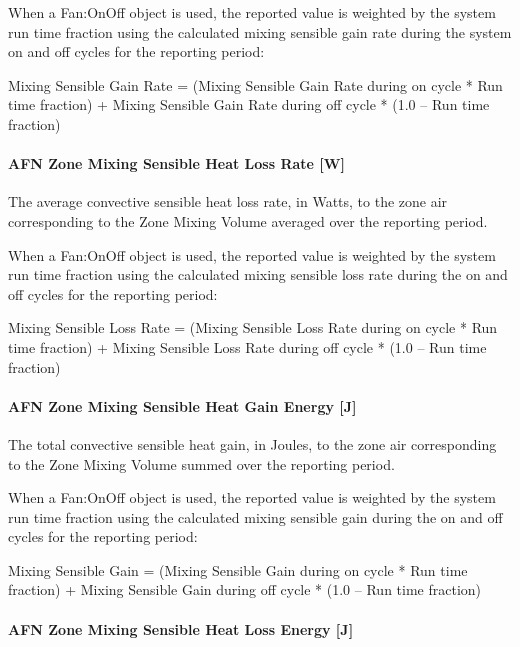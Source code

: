 When a Fan:OnOff object is used, the reported value is weighted by the system run time fraction using the calculated mixing sensible gain rate during the system on and off cycles for the reporting period:

Mixing Sensible Gain Rate = (Mixing Sensible Gain Rate during on cycle * Run time fraction) + Mixing Sensible Gain Rate during off cycle * (1.0 -- Run time fraction)

\paragraph{AFN Zone Mixing Sensible Heat Loss Rate {[}W{]}}\label{afn-zone-mixing-sensible-heat-loss-rate-w}

The average convective sensible heat loss rate, in Watts, to the zone air corresponding to the Zone Mixing Volume averaged over the reporting period.

When a Fan:OnOff object is used, the reported value is weighted by the system run time fraction using the calculated mixing sensible loss rate during the on and off cycles for the reporting period:

Mixing Sensible Loss Rate = (Mixing Sensible Loss Rate during on cycle * Run time fraction) + Mixing Sensible Loss Rate during off cycle * (1.0 -- Run time fraction)

\paragraph{AFN Zone Mixing Sensible Heat Gain Energy {[}J{]}}\label{afn-zone-mixing-sensible-heat-gain-energy-j}

The total convective sensible heat gain, in Joules, to the zone air corresponding to the Zone Mixing Volume summed over the reporting period.

When a Fan:OnOff object is used, the reported value is weighted by the system run time fraction using the calculated mixing sensible gain during the on and off cycles for the reporting period:

Mixing Sensible Gain = (Mixing Sensible Gain during on cycle * Run time fraction) + Mixing Sensible Gain during off cycle * (1.0 -- Run time fraction)

\paragraph{AFN Zone Mixing Sensible Heat Loss Energy {[}J{]}}\label{afn-zone-mixing-sensible-heat-loss-energy-j}

